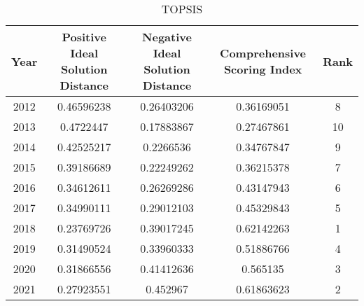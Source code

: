 \documentclass[12pt]{article}
\begin{document}
	
	\begin{table}[!htbp]
		\begin{center}
			\caption{TOPSIS}
			\label{tb:topsis}
			\begin{tabular}{ccccc}
				\toprule
				\multicolumn{1}{m{3cm}}{\centering \textbf{Year}}
				& \multicolumn{1}{m{3cm}}{\centering \textbf{Positive Ideal Solution Distance} \bm{$D^{+}$}}
				& \multicolumn{1}{m{3cm}}{\centering \textbf{Negative Ideal Solution Distance} \bm{$D^{-}$}}
				& \multicolumn{1}{m{3cm}}{\centering \textbf{Comprehensive Scoring Index}}
				& \multicolumn{1}{m{3cm}}{\centering \textbf{Rank}}\\
				\midrule
				2012 & 0.46596238 & 0.26403206 & 0.36169051 & 8 \\
				2013 & 0.4722447 & 0.17883867 & 0.27467861 & 10 \\
				2014 & 0.42525217 & 0.2266536 & 0.34767847 & 9 \\
				2015 & 0.39186689 & 0.22249262 & 0.36215378 & 7 \\
				2016 & 0.34612611 & 0.26269286 & 0.43147943 & 6 \\
				2017 & 0.34990111 & 0.29012103 & 0.45329843 & 5 \\
				2018 & 0.23769726 & 0.39017245 & 0.62142263 & 1 \\
				2019 & 0.31490524 & 0.33960333 & 0.51886766 & 4 \\
				2020 & 0.31866556 & 0.41412636 & 0.565135 & 3 \\
				2021 & 0.27923551 & 0.452967 & 0.61863623 & 2 \\
				\bottomrule
			\end{tabular}
		\end{center}
		
	\end{table}
	
\end{document}
